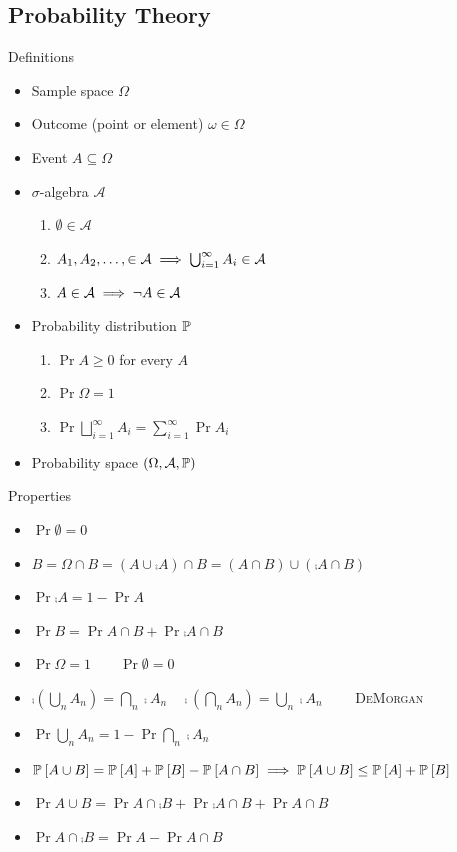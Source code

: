 \documentclass[landscape]{article}
\begin{document}
\begin{multicols*}{2}

\section{Probability Theory}

Definitions
\begin{itemize}
  \item Sample space $\Omega$
  \item Outcome (point or element) $\omega \in \Omega$
  \item Event $A \subseteq \Omega$
  \item $\sigma$-algebra $\mathcal{A}$
    \begin{enumerate}
      \item $\emptyset \in \mathcal{A}$
      \item $A_1,A_2,\dots, \in \mathcal{A} 
        \;\Longrightarrow\; \bigcup_{i=1}^\infty A_i \in \mathcal{A}$
      \item $A \in \mathcal{A} \;\Longrightarrow\; \neg{A} \in \mathcal{A}$
    \end{enumerate}
  \item Probability distribution $\mathbb{P}$
    \begin{enumerate}
      \item $\Pr{A} \ge 0$ for every $A$
      \item $\Pr{\Omega} = 1$
      \item $\Pr{\displaystyle\bigsqcup_{i=1}^\infty A_i} 
        = \displaystyle\sum_{i=1}^\infty \Pr{A_i}$
    \end{enumerate}
  \item Probability space $(\Omega,\mathcal{A},\mathbb{P})$
\end{itemize}

Properties
\begin{itemize}
  \item $\Pr{\emptyset} = 0$
  \item $B = \Omega \cap B = (A \cup \comp{A}) \cap B 
    = (A \cap B) \cup (\comp{A} \cap B)$
  \item $\Pr{\comp{A}} = 1 - \Pr{A}$
  \item $\Pr{B} = \Pr{A \cap B} + \Pr{\comp{A} \cap B}$
  \item $\Pr{\Omega} = 1 \qquad \Pr{\emptyset} = 0$
  \item $\comp{\left(\bigcup_n A_n\right)} = \bigcap_n \comp{A_n}
    \quad
    \comp{\left(\bigcap_n A_n\right)} = \bigcup_n \comp{A_n}
    \qquad$ 
    \textsc{DeMorgan} 
  \item $\Pr{\bigcup_n A_n}
    = 1 - \Pr{\bigcap_n \comp{A_n}}$
  \item $\mathbb{P}_{}\left[A \cup B\right] = \mathbb{P}_{}\left[A\right] + \mathbb{P}_{}\left[B\right] - \mathbb{P}_{}\left[A \cap B\right]\\[1ex]
    \;\Longrightarrow\; \mathbb{P}_{}\left[A \cup B\right] \le \mathbb{P}_{}\left[A\right] + \mathbb{P}_{}\left[B\right]$
  \item $\Pr{A \cup B} 
    = \Pr{A \cap \comp{B}} + \Pr{\comp{A} \cap B} + \Pr{A \cap B}$
  \item $\Pr{A \cap \comp{B}} = \Pr{A} - \Pr{A \cap B}$
\end{itemize}


\end{multicols*}
\end{document}
